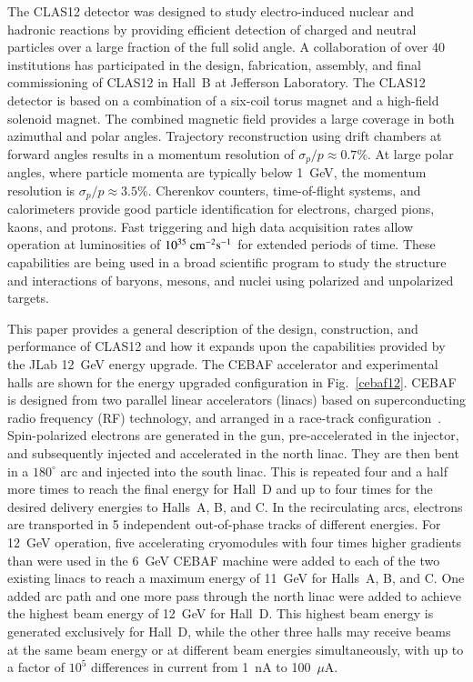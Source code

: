 \documentclass[final,3p]{elsarticle}
\begin{document}
\begin{twocolumn}
The CLAS12 detector was designed to study electro-induced nuclear and hadronic reactions by providing efficient
detection of charged and neutral particles over a large fraction of the full solid angle. A collaboration of over 40
institutions has participated in the design, fabrication, assembly, and final commissioning of CLAS12 in Hall~B at 
Jefferson Laboratory. The CLAS12 detector is based on a combination of a six-coil torus magnet and a high-field
solenoid magnet. The combined magnetic field provides a large coverage in both azimuthal and polar angles.
Trajectory reconstruction using drift chambers at forward angles results in a momentum resolution of
${\sigma_p / p} \approx 0.7\%$. At large polar angles, where particle momenta are typically below 1~GeV, the 
momentum resolution is $\sigma_p / p \approx 3.5\%$. Cherenkov counters, time-of-flight systems, and
calorimeters provide good particle identification for electrons, charged pions, kaons, and protons. Fast triggering
and high data acquisition rates allow operation at luminosities of $10^{35}~\rm{cm}^{-2}\rm{s}^{-1}$ for extended
periods of time. These capabilities are being used in a broad scientific program to study the structure and
interactions of baryons, mesons, and nuclei using polarized and unpolarized targets. 

This paper provides a general description of the design, construction, and performance of CLAS12 and how it expands
upon the capabilities provided by the JLab 12~GeV energy upgrade. The CEBAF accelerator and experimental halls
are shown for the energy upgraded configuration in Fig.~\ref{cebaf12}. CEBAF is designed from two parallel linear
accelerators (linacs) based on superconducting radio frequency (RF) technology, and arranged in a race-track
configuration~\cite{Leemann:2001dg}. Spin-polarized electrons are generated in the gun, pre-accelerated in the
injector, and subsequently injected and accelerated in the north linac. They are then bent in a $180^\circ$ arc and
injected into the south linac. This is repeated four and a half more times to reach the final energy for Hall~D and up to
four times  for the desired delivery energies to Halls~A, B, and C. In the recirculating arcs, electrons are transported
in 5 independent out-of-phase tracks of different energies. For 12~GeV operation, five accelerating cryomodules with
four times higher gradients than were used in the 6~GeV CEBAF machine were added to each of the two existing linacs
to reach a maximum energy of 11~GeV for Halls~A, B, and C. One added arc path and one more pass through the north
linac were added to achieve the highest beam energy of 12~GeV for Hall~D. This highest beam energy is generated
exclusively for Hall~D, while the other three halls may receive beams at the same beam energy or at different beam
energies simultaneously, with up to a factor of $10^5$ differences in current from 1~nA to 100~$\mu$A.


\end{twocolumn}
\end{document}
